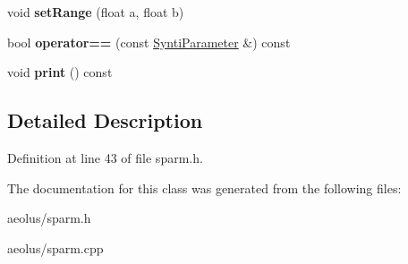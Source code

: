 \begin{DoxyCompactItemize}
void {\bfseries set\+Range} (float a, float b)
\item 
\mbox{\label{class_synti_parameter_a07fd1b16c0c285ebf00781c0e9310dd0}} 
bool {\bfseries operator==} (const \hyperlink{class_synti_parameter}{Synti\+Parameter} \&) const
\item 
\mbox{\label{class_synti_parameter_ab2c0288aa98d1b421c90f4960db2b69c}} 
void {\bfseries print} () const
\end{DoxyCompactItemize}


\subsection{Detailed Description}


Definition at line 43 of file sparm.\+h.



The documentation for this class was generated from the following files\+:\begin{DoxyCompactItemize}
\item 
aeolus/sparm.\+h\item 
aeolus/sparm.\+cpp\end{DoxyCompactItemize}
